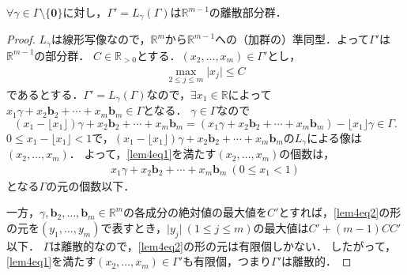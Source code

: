 \begin{screen}
  \begin{lem}
    \label{discrete_subgroup_lemma_4}
    $\forall\gamma\in\Gamma\setminus\{\boldsymbol{0}\}$に対し，$\Gamma'=L_\gamma(\Gamma)$は$\mathbb{R}^{m-1}$の離散部分群．
  \end{lem}
\end{screen}
\begin{proof}
  $L_\gamma$は線形写像なので，$\mathbb{R}^m$から$\mathbb{R}^{m-1}$への（加群の）準同型．よって$\Gamma'$は$\mathbb{R}^{m-1}$の部分群．
  $C\in\mathbb{R}_{>0}$とする．$(x_2,\ldots,x_m)\in\Gamma'$とし，
  \begin{align}
    \max_{2\leq j\leq m}\lvert x_j\rvert\leq C\label{lem4eq1}
  \end{align}
  であるとする．$\Gamma'=L_\gamma(\Gamma)$なので，$\exists x_1\in\mathbb{R}$によって$x_1\gamma+x_2\boldsymbol{b}_2+\cdots+x_m\boldsymbol{b}_m\in\Gamma$となる．
  $\gamma\in\Gamma$なので
  \[(x_1-\lfloor x_1\rfloor)\gamma+x_2\boldsymbol{b}_2+\cdots+x_m\boldsymbol{b}_m=(x_1\gamma+x_2\boldsymbol{b}_2+\cdots+x_m\boldsymbol{b}_m)-\lfloor x_1\rfloor\gamma\in\Gamma.\]
  $0\leq x_1-\lfloor x_1\rfloor< 1$で，$(x_1-\lfloor x_1\rfloor)\gamma+x_2\boldsymbol{b}_2+\cdots+x_m\boldsymbol{b}_m$の$L_\gamma$による像は$(x_2,\ldots,x_m)$．
  よって，\eqref{lem4eq1}を満たす$(x_2,\ldots,x_m)$の個数は，
  \begin{align}
    x_1\gamma+x_2\boldsymbol{b}_2+\cdots+x_m\boldsymbol{b}_m\ (0\leq x_1< 1)\label{lem4eq2}
  \end{align}
  となる$\Gamma$の元の個数以下．

  一方，$\gamma,\boldsymbol{b}_2,\ldots,\boldsymbol{b}_m\in\mathbb{R}^m$の各成分の絶対値の最大値を$C'$とすれば，\eqref{lem4eq2}の形の元を$(y_1,\ldots,y_m)$で表すとき，$\lvert y_j\rvert\ (1\leq j\leq m)$の最大値は$C'+(m-1)CC'$以下．
  $\Gamma$は離散的なので，\eqref{lem4eq2}の形の元は有限個しかない．
  したがって，\eqref{lem4eq1}を満たす$(x_2,\ldots,x_m)\in\Gamma'$も有限個，つまり$\Gamma'$は離散的．
\end{proof}

